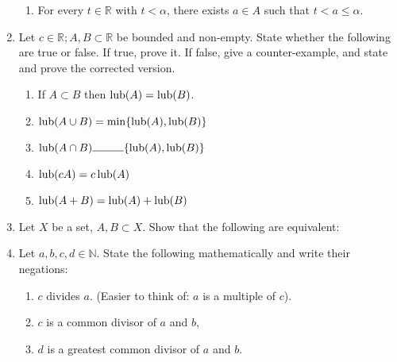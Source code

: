 \begin{enumerate}[label = (\arabic*)]
\begin{enumerate}[nosep]
        \item For every $t\in\mathbb{R}$ with $t < \alpha$, there exists $a\in A$ such that $t < a \le \alpha$.
    \end{enumerate}
    \item Let $c \in \mathbb{R}; A, B \subset \mathbb{R}$ be bounded and non-empty. State whether the following are true or false. If true, prove it. If false, give a counter-example, and state and prove the corrected version.
    \begin{enumerate}[nosep]
        \item If $A\subset B$ then $\operatorname{lub}(A) = \operatorname{lub}(B)$.
        \item $\operatorname{lub}(A\cup B) = \min\{\operatorname{lub}(A), \operatorname{lub}(B)\}$
        \item $\lub(A\cap B) \rule{1cm}{0.15mm}\{\lub(A), \lub(B)\}$
        \item $\operatorname{lub}(cA) = c \operatorname{lub}(A)$
        \item $\operatorname{lub}(A+B) = \operatorname{lub}(A) + \operatorname{lub}(B)$
    \end{enumerate}
    \item Let $X$ be a set, $A, B \subset X$. Show that the following are equivalent:\\
    \item Let $a, b, c, d \in \mathbb{N}$. State the following mathematically and write their negations:
    \begin{enumerate}[nosep]
        \item $c$ divides $a$. (Easier to think of: $a$ is a multiple of $c$).
        \item $c$ is a common divisor of $a$ and $b$,
        \item $d$ is a greatest common divisor of $a$ and $b$.
    \end{enumerate}
\end{enumerate}